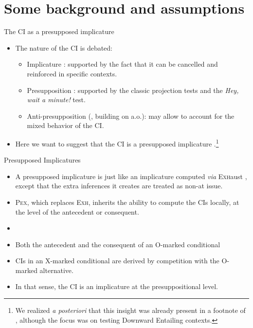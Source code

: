 \documentclass[10pt]{beamer}
\begin{document}
\section[Some background]{Some background and assumptions}
	
\begin{frame}{The CI as a presupposed implicature}
	\begin{itemize}
		\item The nature of the CI is debated:
		\begin{itemize}
			\item Implicature \cite{Iatridou2000,Ippolito2003} : supported by the fact that it can be cancelled and reinforced in specific contexts.
			\item Presupposition \cite{vonFintel1998,Karawani2014} : supported by the classic projection tests and the \textit{Hey, wait a minute!} test.
			\item Anti-presupposition (\cite{Leahy2011, Leahy2018}, building on \cite{Heim1991,Sauerland2003,Percus2006} a.o.): may allow to account for the mixed behavior of the CI.
		\end{itemize}
		\item Here we want to suggest that the CI is a presupposed implicature \cite{Bassi2021}.\footnote{We realized \textit{a posteriori} that this insight was already present in a footnote of \cite{Bassi2021}, although the focus was on testing Downward Entailing contexts.}
	\end{itemize}
\end{frame}

\begin{frame}{Presupposed Implicatures}
	\begin{itemize}
		\item A presupposed implicature is just like an implicature computed \textit{via} \textsc{Exh}aust \cite{Fox2007,Spector2008}, except that the extra inferences it creates are treated as non-at issue. 
		\item \textsc{Pex}, which replaces \textsc{Exh}, inherits the ability  to compute the CIs locally, at the level of the antecedent or consequent.\vspace{2mm}
	\end{itemize}
\end{frame}
\begin{frame}{}
	\begin{itemize}
		\item 
		\item Both the antecedent and the consequent of an O-marked conditional
		\item CIs in an X-marked conditional are derived by competition with the O-marked alternative.
		\item In that sense, the CI is an implicature at the presuppositional level.
	\end{itemize}
\end{frame}
\end{document}
